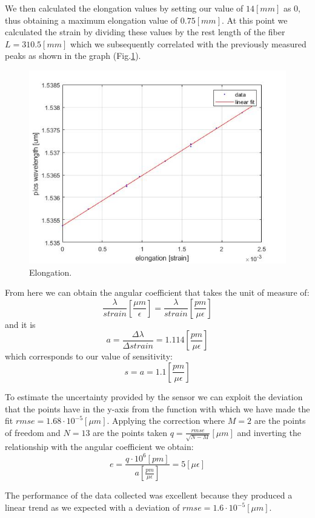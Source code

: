 We then calculated the elongation values by setting our value of $14 [mm]$ as 0, thus obtaining a maximum elongation value of $0.75 [mm]$. At this point we calculated the strain by dividing these values by the rest length of the fiber $L = 310.5 [mm]$ which we subsequently correlated with the previously measured peaks as shown in the graph (Fig.\ref{fig:spins}).
\begin{figure}[h]
    \centering
    \includegraphics[scale=0.7]{img/spins.jpg}
    \caption{Elongation.}
    \label{fig:spins}
\end{figure}
From here we can obtain the angular coefficient that takes the unit of measure of:
$$\frac{\lambda}{strain}\left[\frac{\mu m}{\epsilon}\right] = \frac{\lambda}{strain}\left[\frac{pm}{\mu\epsilon}\right]$$
and it is
$$a = \frac{\Delta \lambda}{ \Delta strain} = 1.114 \left[\frac{pm}{\mu\epsilon}\right]$$
which corresponds to our value of sensitivity:
$$s = a = 1.1 \left[\frac{pm}{\mu\epsilon}\right]$$

To estimate the uncertainty provided by the sensor we can exploit the deviation that the points have in the y-axis from the function with which we have made the fit $rmse = 1.68\cdot10^{-5} [\mu m]$. Applying the correction where $M = 2$ are the points of freedom and $N = 13$ are the points taken $q = \frac{rmse}{\sqrt{N - M}} [\mu m]$ and inverting the relationship with the angular coefficient we obtain:
$$e = \frac{q \cdot 10^{6} [pm]}{a \left[\frac{pm}{\mu\epsilon}\right]} = 5 [\mu\epsilon]$$

\newpage
{}
The performance of the data collected was excellent because they produced a linear trend as we expected with a deviation of $rmse = 1.6 \cdot 10^{-5}[\mu m]$.

